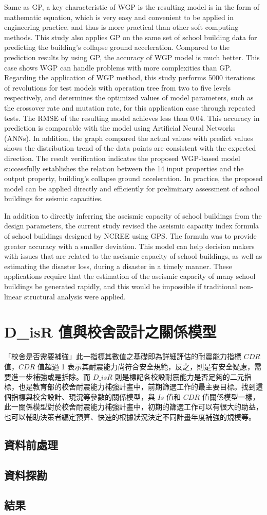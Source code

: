 Same as GP, a key characteristic of WGP is the resulting model is in the form of mathematic equation, which is very easy and convenient to be applied in engineering practice, and thus is more practical than other soft computing methods. This study also applies GP on the same set of school building data for predicting the building’s collapse ground acceleration. Compared to the prediction results by using GP, the accuracy of WGP model is much better. This case shows WGP can handle problems with more complexities than GP. Regarding the application of WGP method, this study performs 5000 iterations of revolutions for test models with operation tree from two to five levels respectively, and determines the optimized values of model parameters, such as the crossover rate and mutation rate, for this application case through repeated tests. The RMSE of the resulting model achieves less than 0.04. This accuracy in prediction is comparable with the model using Artificial Neural Networks (ANNs). In addition, the graph compared the actual values with predict values shows the distribution trend of the data points are consistent with the expected direction. The result verification indicates the proposed WGP-based model successfully establishes the relation between the 14 input properties and the output property, building’s collapse ground acceleration. In practice, the proposed model can be applied directly and efficiently for preliminary assessment of school buildings for seismic capacities.



In addition to directly inferring the aseismic capacity of school buildings from the design parameters, the current study revised the aseismic capacity index formula of school buildings designed by NCREE using GPS. The formula was to provide greater accuracy with a smaller deviation. This model can help decision makers with issues that are related to the aseismic capacity of school buildings, as well as estimating the disaster loss, during a disaster in a timely manner. These applications require that the estimation of the aseismic capacity of many school buildings be generated rapidly, and this would be impossible if traditional non-linear structural analysis were applied.

\section{D\_isR 值與校舍設計之關係模型}

「校舍是否需要補強」此一指標其數值之基礎即為詳細評估的耐震能力指標 $CDR$ 值，$CDR$ 值超過 1 表示其耐震能力尚符合安全規範，反之，則是有安全疑慮，需要進一步補強或是拆除。而 $D\_isR$ 則是標記各校設耐震能力是否足夠的二元指標，也是教育部的校舍耐震能力補強計畫中，前期篩選工作的最主要目標。找到這個指標與校舍設計、現況等參數的關係模型，與 $Is$ 值和 $CDR$ 值關係模型一樣，此一關係模型對於校舍耐震能力補強計畫中，初期的篩選工作可以有很大的助益，也可以輔助決策者編定預算、快速的根據狀況決定不同計畫年度補強的規模等。

\subsection{資料前處理}
\subsection{資料探勘}
\subsection{結果}

